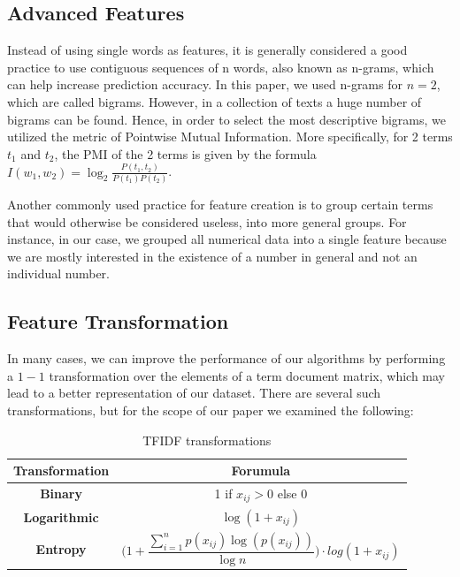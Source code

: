 \documentclass[10pt,journal,compsoc]{IEEEtran}
\begin{document}
\subsection{Advanced Features}
Instead of using single words as features, it is generally 
considered a good practice to use contiguous sequences of
n words, also known as n-grams, which can help increase
prediction accuracy.
In this paper, we used n-grams for $n=2$, which are called
bigrams.
However, in a collection of texts a huge number of bigrams
can be found.
Hence, in order to select the most descriptive bigrams, 
we utilized the metric of Pointwise Mutual Information.
More specifically, for 2 terms $t_1$ and $t_2$, the
PMI of the 2 terms is given by the formula 
$I(w_1,w_2)=\log_2\frac{P(t_1,t_2)}{P(t_1)P(t_2)}$.

Another commonly used practice for feature creation 
is to group certain terms that would otherwise be
considered useless, into more general groups.
For instance, in our case, we grouped all numerical
data into a single feature because we are mostly
interested in the existence of a number in general
and not an individual number.

\subsection{Feature Transformation}
In many cases, we can improve the performance of
our algorithms by performing a $1-1$ transformation
over the elements of a term document matrix, which
may lead to a better representation of our dataset.
There are several such transformations, but for
the scope of our paper we examined the following:

\begin{table}[!h]
\renewcommand{\arraystretch}{2}
\caption{TFIDF transformations}
\label{transformation}
\centering
\begin{tabular}{|c|c|}
\hline
Transformation & Forumula\\
\hline
\textbf{Binary} & 1 if $x_{ij}>0$ else 0\\
\hline
\textbf{Logarithmic} & $\log(1+x_{ij})$\\
\hline
\textbf{Entropy} & $\Bigg(1+\dfrac{\sum_{i=1}^{n}p(x_{ij})\log(p(x_{ij}))}{\log{n}}\Bigg)\cdot log(1+x_{ij})$\\
\hline
\end{tabular}
\end{table}
 
\end{document}
